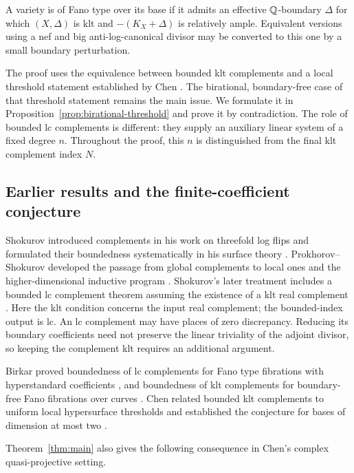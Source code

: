 A variety is of Fano type over its base if it admits an effective
$\mathbb Q$-boundary $\Delta$ for which $(X,\Delta)$ is klt and
$-(K_X+\Delta)$ is relatively ample. Equivalent versions using a nef and big
anti-log-canonical divisor may be converted to this one by a small boundary
perturbation.

The proof uses the equivalence between bounded klt complements and a local
threshold statement established by Chen \cite[Theorem~1.6]{Chen}. The
birational, boundary-free case of that threshold statement remains the main
issue. We formulate it in Proposition~\ref{prop:birational-threshold} and
prove it by contradiction. The role of bounded lc complements is different:
they supply an auxiliary linear system of a fixed degree $n$. Throughout the
proof, this $n$ is distinguished from the final klt complement index $N$.

\subsection{Earlier results and the finite-coefficient conjecture}

Shokurov introduced complements in his work on threefold log flips
\cite[Section~5]{ShokurovFlips} and formulated their boundedness
systematically in his surface theory \cite[Conjecture~1.3]{ShokurovSurfaces}.
Prokhorov--Shokurov developed the passage from global complements to local
ones and the higher-dimensional inductive program
\cite{ProkhorovShokurovFirst,ProkhorovShokurov}.
Shokurov's later treatment includes a bounded lc complement theorem
assuming the existence of a klt real complement
\cite[Theorem~3]{ShokurovComplements}. Here the klt condition concerns
the input real complement; the bounded-index output is lc.
An lc complement may have places of zero discrepancy. Reducing its
boundary coefficients need not preserve the linear triviality of the
adjoint divisor, so keeping the complement klt requires an additional
argument.

Birkar proved boundedness of lc complements for Fano type fibrations with
hyperstandard coefficients \cite[Theorems~1.7 and~1.8]{BirkarComplements},
and boundedness of klt complements for boundary-free Fano fibrations over curves
\cite[Corollary~1.4]{BirkarFibrations}. Chen related bounded klt complements
to uniform local hypersurface thresholds and established the conjecture for
bases of dimension at most two
\cite[Theorem~1.6 and Corollary~1.8]{Chen}.

Theorem~\ref{thm:main} also gives the following consequence in Chen's
complex quasi-projective setting.

